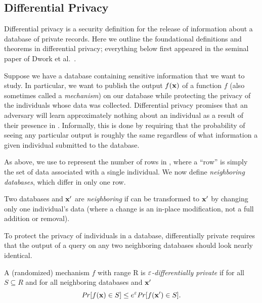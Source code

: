 \subsection{Differential Privacy}
Differential privacy is a security definition for the release of information about a database of private records. Here we outline the foundational definitions and theorems in differential privacy; everything below first appeared in the seminal paper of Dwork et al.~\cite{dwork2006calibrating}.

Suppose we have a database \x containing sensitive information that we want to study. In particular, we want to publish the output $f(\mathbf{x})$ of a function $f$ (also sometimes called a \textit{mechanism}) on our database while protecting the privacy of the individuals whose data was collected. Differential privacy promises that an adversary will learn approximately nothing about an individual as a result of their presence in \x.  Informally, this is done by requiring that the probability of seeing any particular output is roughly the same regardless of what information a given individual submitted to the database.

As above, we use \dbsize to represent the number of rows in \x, where a ``row'' is simply the set of data associated with a single individual.  We now define \textit{neighboring databases}, which differ in only one row.

\begin{definition}\label{def:Neighboring} Two databases \x and $\mathbf{x}'$ are \textit{neighboring} if \x can be transformed to $\mathbf{x}'$ by changing only one individual's data (where a change is an in-place modification, not a full addition or removal).
\end{definition}

To protect the privacy of individuals in a database, differentially private requires that the output of a query on any two neighboring databases should look nearly identical.

\begin{definition} \label{def:diffpriv}
A (randomized) mechanism $f$ with range R is \emph{$\varepsilon$-differentially private} if for all $S \subseteq R$ and for all neighboring databases \x and $\mathbf{x}'$
\begin{equation*}
\text{\emph{Pr}}[f(\mathbf{x}) \in S] \leq e^{\varepsilon} \text{\emph{Pr}}[f(\mathbf{x}') \in S]. 
\end{equation*}
\end{definition}

